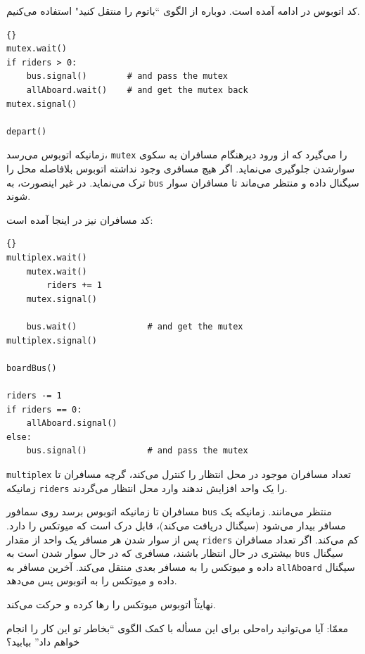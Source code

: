 \documentclass{book}
\begin{document}
    کد اتوبوس در ادامه آمده است. دوباره از الگوی ``باتوم را منتقل کنید" استفاده می‌کنیم. 

\begin{latin}
\begin{lstlisting}[title=\rl{راه‌حل مسأله اتوبوس (اتوبوس)}]{}
mutex.wait()
if riders > 0:
    bus.signal()        # and pass the mutex
    allAboard.wait()    # and get the mutex back
mutex.signal()

depart()
\end{lstlisting}
\end{latin}

    زمانیکه اتوبوس می‌رسد، {\tt mutex} را می‌گیرد که  از ورود دیرهنگام مسافران به سکوی سوارشدن جلوگیری ‌می‌نماید.
    اگر هیچ مسافری وجود نداشته اتوبوس بلافاصله محل را ترک می‌نماید. در غیر اینصورت، به {\tt bus} سیگنال داده و 
    منتظر می‌ماند تا مسافران سوار شوند. 

    کد مسافران نیز در اینجا آمده است:

\begin{latin}
\begin{lstlisting}[title=\rl{راه‌حل مسأله اتوبوس (مسافران)}]{}
multiplex.wait()
    mutex.wait()
        riders += 1
    mutex.signal()

    bus.wait()              # and get the mutex
multiplex.signal()

boardBus()

riders -= 1
if riders == 0:
    allAboard.signal() 
else:
    bus.signal()            # and pass the mutex
\end{lstlisting}
\end{latin}

    {\tt multiplex}
    تعداد مسافران موجود در محل انتظار را کنترل می‌کند، گرچه مسافران تا زمانیکه {\tt riders} را یک واحد افزایش ندهند وارد محل انتظار می‌گردند. 
    

    مسافران تا زمانیکه اتوبوس برسد روی سمافور  {\tt bus} منتظر می‌‌مانند. زمانیکه یک مسافر بیدار می‌شود (سیگنال دریافت می‌کند)، قابل درک است که 
    میوتکس را دارد. پس از سوار شدن هر مسافر یک واحد از مقدار  {\tt riders} کم می‌کند. اگر تعداد مسافران بیشتری در حال انتظار باشند، 
    مسافری که در حال سوار شدن است به  {\tt bus} سیگنال داده و میوتکس را به مسافر بعدی منتقل می‌کند. 
    آخرین مسافر به {\tt allAboard} سیگنال داده و میوتکس را به اتوبوس پس می‌دهد. 

    نهایتاً اتوبوس میوتکس را رها کرده و حرکت می‌کند. 

    معمّا: آیا می‌توانید راه‌حلی برای این مسأله با کمک الگوی ``بخاطر تو این کار را انجام خواهم داد'' بیابید؟
\end{document}
